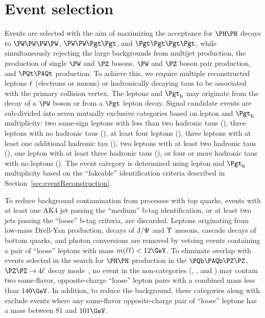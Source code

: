 \section{Event selection}
\label{sec:eventSelection}

Events are selected with the aim of maximizing the acceptance for $\HH$ decays to $\WWWW$, $\WWtt$, and
$\tttt$, while simultaneously rejecting the large backgrounds from multijet production,
the production of single $\PW$ and $\PZ$ bosons, $\PW$ and $\PZ$ boson pair production, and $\ttbar$ production.  To achieve this, we require multiple
reconstructed leptons $\ell$ (electrons or muons) or hadronically decaying taus
\tauh to be associated with the primary collision vertex.  The leptons and $\tauh$ may originate
from the decay of a $\PW$ boson or from a $\Pgt$ lepton decay.  Signal candidate events
are sub-divided into seven mutually exclusive categories based on lepton and $\tauh$
multiplicity: two same-sign leptons with less than two hadronic taus (\llss),
three leptons with no hadronic taus (\lllnot), at least four leptons (\llll),
three leptons with at least one additional hadronic tau (\lllt), two
leptons with at least two hadronic taus (\lltt), one lepton with at least
three hadronic taus (\lttt), or four or more hadronic taus with no leptons (\noltttt).
The event category is determined using lepton and $\tauh$ multiplicity based on the
``fakeable'' identification criteria described in Section~\ref{sec:eventReconstruction}.

To reduce background contamination from processes with top quarks, events with
at least one AK4 jet passing the ``medium'' b-tag identification, or at least two
jets passing the ``loose'' b-tag criteria, are discarded. 
Leptons originating from low-mass Drell-Yan production, decays of $\textrm{J}/\Psi$ and $\Upsilon$ mesons,
cascade decays of bottom quarks, and photon conversions
are removed by vetoing events containing a pair of ``loose'' leptons with mass $m(\leplep) < 12\GeV$.
To eliminate overlap with events selected in the search for $\HH$ production in the $\Pbottom\APbottom\PZ\PZ$, $\PZ\PZ \to 4\Plepton$ decay mode~\cite{HIG-20-004}, no event in the
non-\tauh categories (\llss, \lllnot, and \llll) may contain two same-flavor,
opposite-charge ``loose'' lepton pairs with a combined mass less than $140\GeV$.
In addition, to reduce the \Zll background, these categories along with
\lltt exclude events where any same-flavor opposite-charge pair of ``loose''
leptons has a mass between $81$ and $101\GeV$.  %

